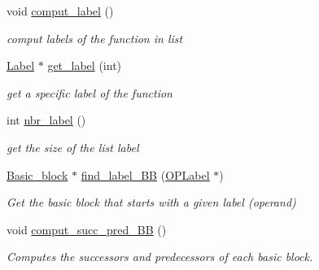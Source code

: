 \begin{DoxyCompactItemize}
void \mbox{\hyperlink{class_function_a1c8830219ce4306c22a933b17f54cc6f}{comput\+\_\+label}} ()
\begin{DoxyCompactList}\small\item\em comput labels of the function in list \end{DoxyCompactList}\item 
\mbox{\label{class_function_a4b2e9837c4b506b3c7a6d1488d9914d1}} 
\mbox{\hyperlink{class_label}{Label}} $\ast$ \mbox{\hyperlink{class_function_a4b2e9837c4b506b3c7a6d1488d9914d1}{get\+\_\+label}} (int)
\begin{DoxyCompactList}\small\item\em get a specific label of the function \end{DoxyCompactList}\item 
\mbox{\label{class_function_a3f3807e12e695ffe23e1ef44edcd262b}} 
int \mbox{\hyperlink{class_function_a3f3807e12e695ffe23e1ef44edcd262b}{nbr\+\_\+label}} ()
\begin{DoxyCompactList}\small\item\em get the size of the list label \end{DoxyCompactList}\item 
\mbox{\label{class_function_ae55c0232d0eced8830daf57293229db8}} 
\mbox{\hyperlink{class_basic__block}{Basic\+\_\+block}} $\ast$ \mbox{\hyperlink{class_function_ae55c0232d0eced8830daf57293229db8}{find\+\_\+label\+\_\+\+BB}} (\mbox{\hyperlink{class_o_p_label}{O\+P\+Label}} $\ast$)
\begin{DoxyCompactList}\small\item\em Get the basic block that starts with a given label (operand) \end{DoxyCompactList}\item 
\mbox{\label{class_function_a3c52c8cb82e0137f02771331018b655c}} 
void \mbox{\hyperlink{class_function_a3c52c8cb82e0137f02771331018b655c}{comput\+\_\+succ\+\_\+pred\+\_\+\+BB}} ()
\begin{DoxyCompactList}\small\item\em Computes the successors and predecessors of each basic block. \end{DoxyCompactList}\item 
\mbox{\label{class_function_a9ecf8e774164937c3dfdb989ebe1c866}} 

\end{DoxyCompactItemize}
